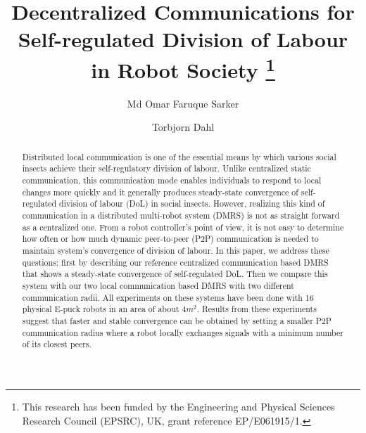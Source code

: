\documentclass{llncs}
\begin{document}
\title{Decentralized Communications for Self-regulated Division of Labour in Robot Society
\thanks{This research has been funded by the Engineering and Physical Sciences Research Council (EPSRC), UK, grant reference EP/E061915/1.}
}
\author{Md Omar Faruque Sarker \and
	Torbjorn Dahl %
}
\maketitle
\begin{abstract}
Distributed local communication is one of the essential means by which various social insects achieve their self-regulatory division of labour. Unlike centralized static communication, this communication mode enables individuals to respond to local changes more quickly and it generally produces steady-state convergence of self-regulated division of labour (DoL) in social insects. However, realizing this kind of communication in a distributed multi-robot system (DMRS) is not as straight forward as a centralized one. From a robot controller's point of view, it is not easy to determine how often or how much dynamic peer-to-peer (P2P) communication  is needed to maintain system's convergence of division of labour. In this paper, we address these questions: first by describing our reference centralized communication based DMRS that shows a steady-state convergence of self-regulated DoL. Then we compare this system with our two local communication based DMRS with two different communication radii. All experiments on these systems  have been done with 16 physical E-puck robots in an area of about 4$m^2$. Results from these experiments suggest that faster and stable convergence can be obtained by setting a smaller P2P communication radius where a robot locally exchanges signals with a minimum number of its closest peers.
\end{abstract}
\addtolength{\parskip}{-3.5mm}
\end{document}
